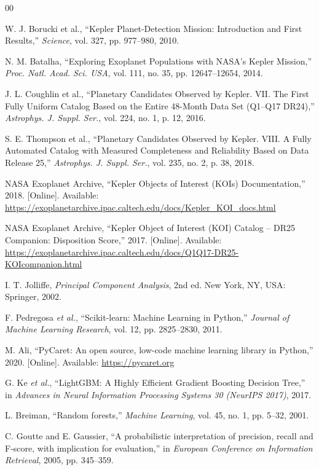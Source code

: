 \begin{thebibliography}{00}

W. J. Borucki et al., ``Kepler Planet-Detection Mission: Introduction and First Results,'' \textit{Science}, vol. 327, pp. 977--980, 2010.

N. M. Batalha, ``Exploring Exoplanet Populations with NASA's Kepler Mission,'' \textit{Proc. Natl. Acad. Sci. USA}, vol. 111, no. 35, pp. 12647--12654, 2014.

J. L. Coughlin et al., ``Planetary Candidates Observed by Kepler. VII. The First Fully Uniform Catalog Based on the Entire 48-Month Data Set (Q1--Q17 DR24),'' \textit{Astrophys. J. Suppl. Ser.}, vol. 224, no. 1, p. 12, 2016.

S. E. Thompson et al., ``Planetary Candidates Observed by Kepler. VIII. A Fully Automated Catalog with Measured Completeness and Reliability Based on Data Release 25,'' \textit{Astrophys. J. Suppl. Ser.}, vol. 235, no. 2, p. 38, 2018.

NASA Exoplanet Archive, ``Kepler Objects of Interest (KOIs) Documentation,'' 2018. [Online]. Available: \url{https://exoplanetarchive.ipac.caltech.edu/docs/Kepler_KOI_docs.html}

NASA Exoplanet Archive, ``Kepler Object of Interest (KOI) Catalog -- DR25 Companion: Disposition Score,'' 2017. [Online]. Available: \url{https://exoplanetarchive.ipac.caltech.edu/docs/Q1Q17-DR25-KOIcompanion.html}

I. T. Jolliffe, \textit{Principal Component Analysis}, 2nd ed. New York, NY, USA: Springer, 2002.

F. Pedregosa \textit{et al.}, ``Scikit-learn: Machine Learning in Python,'' \textit{Journal of Machine Learning Research}, vol. 12, pp. 2825--2830, 2011.

M. Ali, ``PyCaret: An open source, low-code machine learning library in Python,'' 2020. [Online]. Available: \url{https://pycaret.org}

G. Ke \textit{et al.}, ``LightGBM: A Highly Efficient Gradient Boosting Decision Tree,'' in \textit{Advances in Neural Information Processing Systems 30 (NeurIPS 2017)}, 2017.

L. Breiman, ``Random forests,'' \textit{Machine Learning}, vol. 45, no. 1, pp. 5--32, 2001.

C. Goutte and E. Gaussier, ``A probabilistic interpretation of precision, recall and F-score, with implication for evaluation,'' in \textit{European Conference on Information Retrieval}, 2005, pp. 345--359.

\end{thebibliography}
